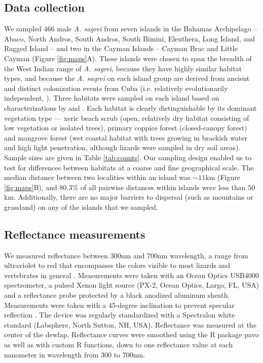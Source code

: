
\subsection*{Data collection}

We sampled 466 male \textit{A. sagrei} from seven islands in the Bahamas Archipelago -- Abaco, North Andros, South Andros, South Bimini, Eleuthera, Long Island, and Ragged Island -- and two in the Cayman Islands -- Cayman Brac and Little Cayman (Figure \ref{fig:maps}A). These islands were chosen to span the breadth of the West Indian range of \textit{A. sagrei}, because they have highly similar habitat types,  and because the \textit{A. sagrei} on each island group are derived from ancient and distinct colonization events from Cuba (i.e. relatively evolutionarily independent, \citealt{Reynolds2020}). Three habitats were sampled on each island based on characterizations by \citet{Howard1950} and \citet{Schoener1968}. Each habitat is clearly distinguishable by its dominant vegetation type --- xeric beach scrub (open, relatively dry habitat consisting of low vegetation or isolated trees), primary coppice forest (closed-canopy forest) and mangrove forest (wet coastal habitat with trees growing in brackish water and high light penetration, although lizards were sampled in dry soil areas). Sample sizes are given in Table \ref{tab:counts}. Our sampling design enabled us to test for differences between habitats at a coarse and fine geographical scale. The median distance between two localities within an island was $\sim 11$km (Figure \ref{fig:maps}B), and $80.3$\% of all pairwise distances within islands were less than $50$km. Additionally, there are no major barriers to dispersal (such as mountains or grassland) on any of the islands that we sampled.

\subsection*{Reflectance measurements}

We measured reflectance between 300nm and 700nm wavelength, a range from ultraviolet to red that encompasses the colors visible to most lizards and vertebrates in general \citep{Lazareva2012}. Measurements were taken with an Ocean Optics USB4000 spectrometer, a pulsed Xenon light source (PX-2, Ocean Optics, Largo, FL, USA) and a reflectance probe protected by a black anodized aluminum sheath. Measurements were taken with a 45-degree inclination to prevent specular reflection \citep{Endler1990}. The device was regularly standardized with a Spectralon white standard (Labsphere, North Sutton, NH, USA). Reflectance was measured at the center of the dewlap. Reflectance curves were smoothed using the R package pavo \citep{Maia2013} as well as with custom R functions, down to one reflectance value at each nanometer in wavelength from 300 to 700nm. 

